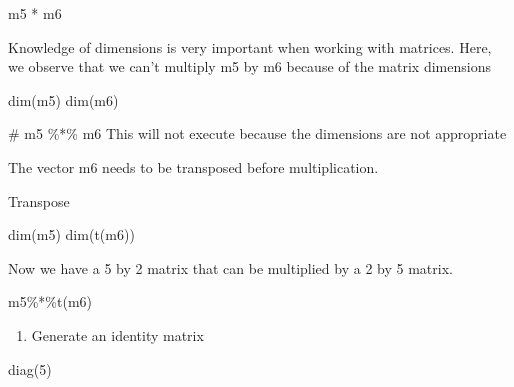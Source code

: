 \documentclass[
  letterpaper,
  DIV=11,
  numbers=noendperiod]{scrreprt}
\newenvironment{Shaded}{}{}
\newcommand{\CommentTok}[1]{\textcolor[rgb]{0.42,0.45,0.49}{#1}}
\newcommand{\DecValTok}[1]{\textcolor[rgb]{0.00,0.36,0.77}{#1}}
\newcommand{\FunctionTok}[1]{\textcolor[rgb]{0.44,0.26,0.76}{#1}}
\newcommand{\NormalTok}[1]{\textcolor[rgb]{0.14,0.16,0.18}{#1}}
\newcommand{\SpecialCharTok}[1]{\textcolor[rgb]{0.00,0.36,0.77}{#1}}
\providecommand{\tightlist}{%
  \setlength{\itemsep}{0pt}\setlength{\parskip}{0pt}}\usepackage{longtable,booktabs,array}
\begin{document}
\begin{Shaded}
\begin{Highlighting}[]
\NormalTok{m5 }\SpecialCharTok{*}\NormalTok{ m6}
\end{Highlighting}
\end{Shaded}

Knowledge of dimensions is very important when working with matrices.
Here, we observe that we can't multiply m5 by m6 because of the matrix
dimensions

\begin{Shaded}
\begin{Highlighting}[]
\FunctionTok{dim}\NormalTok{(m5)}
\FunctionTok{dim}\NormalTok{(m6)}
\end{Highlighting}
\end{Shaded}

\begin{Shaded}
\begin{Highlighting}[]
\CommentTok{\# m5 \%*\% m6 This will not execute because the dimensions are not appropriate}
\end{Highlighting}
\end{Shaded}

The vector m6 needs to be transposed before multiplication.

Transpose

\begin{Shaded}
\begin{Highlighting}[]
\FunctionTok{dim}\NormalTok{(m5)}
\FunctionTok{dim}\NormalTok{(}\FunctionTok{t}\NormalTok{(m6))}
\end{Highlighting}
\end{Shaded}

Now we have a 5 by 2 matrix that can be multiplied by a 2 by 5 matrix.

\begin{Shaded}
\begin{Highlighting}[]
\NormalTok{m5}\SpecialCharTok{\%*\%}\FunctionTok{t}\NormalTok{(m6)}
\end{Highlighting}
\end{Shaded}

\begin{enumerate}
\def\labelenumi{\alph{enumi}.}
\setcounter{enumi}{4}
\tightlist
\item
  Generate an identity matrix
\end{enumerate}

\begin{Shaded}
\begin{Highlighting}[]
\FunctionTok{diag}\NormalTok{(}\DecValTok{5}\NormalTok{)}
\end{Highlighting}
\end{Shaded}
\end{document}
